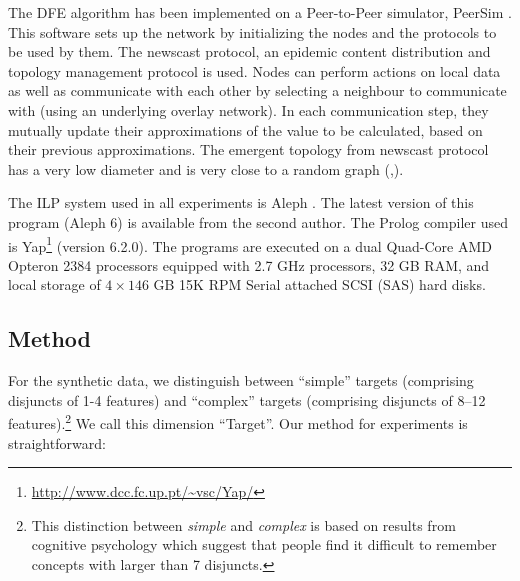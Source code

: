 The DFE algorithm has been implemented on a
Peer-to-Peer simulator, PeerSim \cite{peersim}. 
This software sets up the network by initializing the nodes and the protocols to be used by them.
The newscast protocol, an epidemic content distribution and topology management
protocol is used. Nodes can perform actions on local data as well as communicate with
each other by selecting a neighbour to communicate with
(using an underlying overlay network).
In each communication step, they mutually update their approximations of the
value to be calculated, based on their previous approximations.
The emergent topology from newscast protocol has a very low diameter and is
very close to a random graph (\cite{Jelasity_04},\cite{Jelasity_05}). %


The ILP system used in all experiments is Aleph \cite{Srinivasan_99a}.
The latest version of this program (Aleph 6) is available from the second author.
The Prolog compiler used is Yap\footnote{\url{http://www.dcc.fc.up.pt/~vsc/Yap/}} (version 6.2.0). The programs are executed on
a dual Quad-Core AMD Opteron 2384 processors equipped with 2.7 GHz processors, 32 GB RAM,
and local storage of $4 \times 146$ GB 15K RPM Serial attached SCSI (SAS) hard disks. 


\subsection{Method}
\label{sec:exptmeth}

For the synthetic data, we distinguish between ``simple'' targets
(comprising disjuncts of 1-4 features) and ``complex'' targets (comprising disjuncts of 8--12 features).\footnote{This
distinction between {\em simple\/} and {\em complex\/} is based on results from cognitive psychology which suggest that people find it 
difficult to remember concepts with larger than 7 disjuncts.}
We call this dimension ``Target''. Our method for experiments is straightforward:

